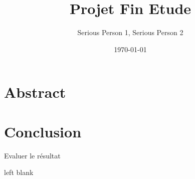 \documentclass[a4paper, 12pt]{report}
\title{Projet Fin Etude}
\author{Serious Person 1, Serious Person 2}
\date{\today}
\begin{document}
	
	\maketitle

	\pagestyle{fancy}	

	\chapter*{Abstract} 

	\pagestyle{plain}	

	\tableofcontents
	
	
	
	
	
	
	\chapter{Conclusion}
		Evaluer le résultat 

	\newpage
	left blank
	\newpage
	\listoffigures
	\printbibliography
\end{document}

